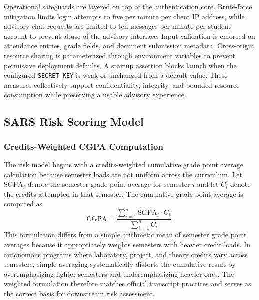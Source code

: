 \documentclass{article}
\begin{document}
Operational safeguards are layered on top of the authentication core. Brute-force mitigation limits login attempts to five per minute per client IP address, while advisory chat requests are limited to ten messages per minute per student account to prevent abuse of the advisory interface. Input validation is enforced on attendance entries, grade fields, and document submission metadata. Cross-origin resource sharing is parameterized through environment variables to prevent permissive deployment defaults. A startup assertion blocks launch when the configured \texttt{SECRET\_KEY} is weak or unchanged from a default value. These measures collectively support confidentiality, integrity, and bounded resource consumption while preserving a usable advisory experience.

\subsection{SARS Risk Scoring Model}
\subsubsection{Credits-Weighted CGPA Computation}
The risk model begins with a credits-weighted cumulative grade point average calculation because semester loads are not uniform across the curriculum. Let $\mathrm{SGPA}_i$ denote the semester grade point average for semester $i$ and let $C_i$ denote the credits attempted in that semester. The cumulative grade point average is computed as
\begin{equation}
\mathrm{CGPA} = \frac{\sum_{i=1}^{n} \mathrm{SGPA}_i \cdot C_i}{\sum_{i=1}^{n} C_i}.
\label{eq:cgpa}
\end{equation}
This formulation differs from a simple arithmetic mean of semester grade point averages because it appropriately weights semesters with heavier credit loads. In autonomous programs where laboratory, project, and theory credits vary across semesters, simple averaging systematically distorts the cumulative result by overemphasizing lighter semesters and underemphasizing heavier ones. The weighted formulation therefore matches official transcript practices and serves as the correct basis for downstream risk assessment.
\end{document}
